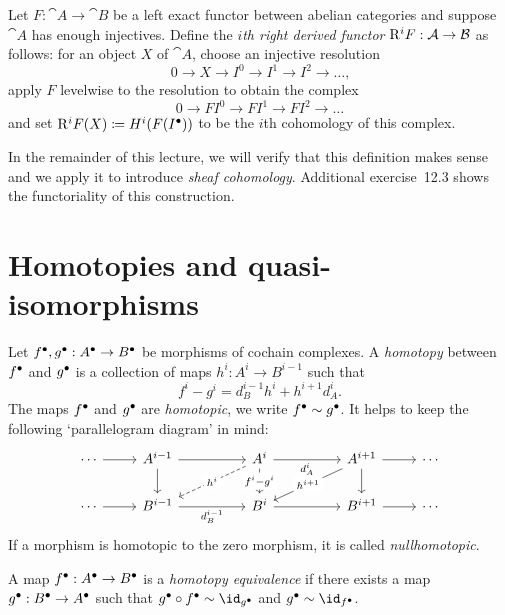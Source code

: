 \begin{defn}
Let \(F\colon\cat A\to\cat B\) be a left exact functor between abelian categories and suppose \(\cat A\) has enough injectives.
Define the \emph{\(i\)th right derived functor} \(\rightderived^iF\colon\cat A\to\cat B\) as follows: for an object \(X\) of \(\cat A\), choose an injective resolution
\[ 0\to X\to I^0\to I^1\to I^2\to\ldots\text{,} \]
apply \(F\) levelwise to the resolution to obtain the complex
\[ 0\to FI^0\to FI^1\to FI^2\to\ldots \]
and set \(\mathrm{R}^iF(X)\coloneq H^i(F(I^\bullet))\) to be the \(i\)th cohomology of this complex.
\end{defn}

In the remainder of this lecture, we will verify that this definition makes sense and we apply it to introduce \emph{sheaf cohomology}.
Additional exercise~12.3 shows the functoriality of this construction.

\section{Homotopies and quasi-isomorphisms}
\begin{defn}
Let ${f}^\bullet, {g}^\bullet: {A}^\bullet \to {B}^\bullet$ be morphisms of cochain complexes. A \emph{homotopy} between ${f}^\bullet$ and ${g}^\bullet$ is a collection of maps $h^i: A^i \to B^{i-1}$ such that \[
	f^i - g^i = d^{i-1}_B h^i + h^{i+1}d^i_A.
\]
The maps ${f}^\bullet$ and ${g}^\bullet$ are \emph{homotopic}, we write ${f}^\bullet \sim {g}^\bullet$. It helps to keep the following `parallelogram diagram' in mind: 
\[\begin{tikzcd}
	{\cdots } & {A^{i-1}} && {A^i} && {A^{i+1}} & \cdots \\
	\cdots & {B^{i-1}} && {B^{i}} && {B^{i+1}} & \cdots
	\arrow[from=1-1, to=1-2]
	\arrow[from=1-2, to=1-4]
	\arrow[from=1-2, to=2-2]
	\arrow["{d^i_A}"', from=1-4, to=1-6]
	\arrow["{h^i}"{description}, dashed, from=1-4, to=2-2]
	\arrow["{f^i - g^i}"{description}, from=1-4, to=2-4]
	\arrow[from=1-6, to=1-7]
	\arrow["{h^{i+1}}"{description}, from=1-6, to=2-4]
	\arrow[from=1-6, to=2-6]
	\arrow[from=2-1, to=2-2]
	\arrow["{d^{i-1}_B}"', from=2-2, to=2-4]
	\arrow[from=2-4, to=2-6]
	\arrow[from=2-6, to=2-7]
\end{tikzcd}\]
If a morphism is homotopic to the zero morphism, it is called \emph{nullhomotopic}.
\end{defn}

\begin{defn}
	A map ${f}^\bullet: {A}^\bullet \to {B}^\bullet$ is a \emph{homotopy equivalence} if there exists a map ${g}^\bullet: {B}^\bullet \to {A}^\bullet$ such that $\cochaincomplex{g} \circ \cochaincomplex{f} \sim \id_{\cochaincomplex{g}}$ and $\cochaincomplex{g} \sim \id_{\cochaincomplex{f}}$. 
\end{defn}

